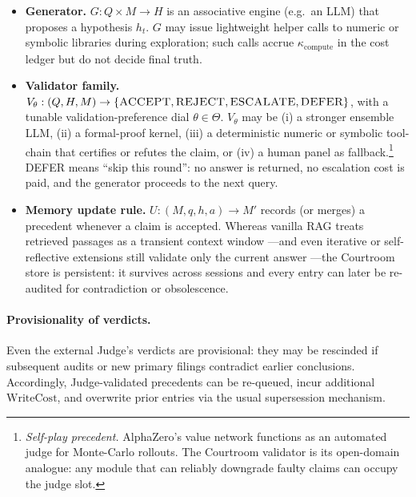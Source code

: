 \documentclass[11pt]{article}
\newcommand{\WriteCost}{\mathrm{WriteCost}}
\begin{document}
\begin{itemize}
  \item \textbf{Generator.}  
  \(G : Q \times M \to H\) is an associative engine (e.g.\ an LLM) that proposes a
  hypothesis \(h_t\).  
  \(G\) may issue lightweight helper calls to numeric or symbolic libraries
  during exploration; such calls accrue \(\kappa_{\text{compute}}\) in the cost ledger
  but do not decide final truth.
  
  \item \textbf{Validator family.}  
  \(V_{\theta} : (Q, H, M) \to \{\textsc{ACCEPT}, \textsc{REJECT}, \textsc{ESCALATE}, \textsc{DEFER}\}\), with a
  tunable validation-preference dial \(\theta \in \Theta\).
  \(V_{\theta}\) may be
  (i) a stronger ensemble LLM,
  (ii) a formal-proof kernel,
  (iii) a deterministic numeric or symbolic tool-chain that certifies or refutes the claim, or
  (iv) a human panel as fallback.\footnote{\textit{Self-play precedent.}  
  AlphaZero's value network functions as an automated judge for Monte-Carlo rollouts.
  The Courtroom validator is its open-domain analogue: any module that can reliably
  downgrade faulty claims can occupy the judge slot.} \textsc{DEFER} means “skip this round”: no answer is returned,
  no escalation cost is paid, and the generator proceeds to the next
  query.
  
  \item \textbf{Memory update rule.}
  \(U : (M, q, h, a) \to M'\) records (or merges) a precedent whenever a claim is
  accepted.  Whereas vanilla RAG treats retrieved passages as a transient
  context window \citep{lewis2020rag}—and even iterative or self-reflective
  extensions still validate only the current answer
  \citep{shao2023iterretgen,asai2024selfrag}—the Courtroom store is
  persistent: it survives across sessions and every entry can later be
  re-audited for contradiction or obsolescence.

  \end{itemize}


\paragraph{Provisionality of verdicts.}
Even the external Judge's verdicts are provisional: they may be rescinded
if subsequent audits or new primary filings contradict earlier
conclusions.  Accordingly, Judge-validated precedents can be re-queued,
incur additional \(\WriteCost\), and overwrite prior entries via the usual
supersession mechanism.
\end{document}

